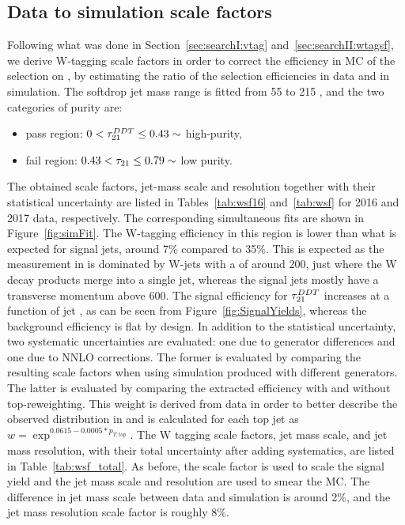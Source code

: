 \subsection{Data to simulation scale factors}
\label{sec:searchIII:wtagSF}
Following what was done in Section~\ref{sec:searchI:vtag} and~\ref{sec:searchII:wtagsf}, we derive W-tagging scale factors in order to correct the efficiency in MC of the selection on \ddt, by estimating the ratio of the selection efficiencies in data and in simulation. The softdrop jet mass range is fitted from 55 to 215 \GeV, and the two categories of purity are:
\begin{itemize}
\itemsep0em
  \item pass region: $0 <  \tau_{21}^{DDT} \leq 0.43 \sim$ high-purity,
  \item fail region: $0.43 < \tau_{21} \leq 0.79 \sim$ low purity.
\end{itemize}
The obtained scale factors, jet-mass scale and resolution together with their statistical uncertainty are listed in Tables~\ref{tab:wsf16} and~\ref{tab:wsf} for 2016 and 2017 data, respectively. The corresponding simultaneous fits are shown in Figure~\ref{fig:simFit}. The W-tagging efficiency in this region is lower than what is expected for signal jets, around 7\% compared to 35\%. This is expected as the measurement in \ttbar is dominated by W-jets with a \PT of around 200\GeV, just where the W decay products merge into a single jet, whereas the signal jets mostly have a transverse momentum above 600\GeV. The signal efficiency for $\tau_{21}^{DDT}$ increases at a function of jet \PT, as can be seen from Figure~\ref{fig:SignalYields}, whereas the background efficiency is flat by design. In addition to the statistical uncertainty, two systematic uncertainties are evaluated: one due to generator differences and one due to NNLO corrections. The former is evaluated by comparing the resulting scale factors when using \ttbar simulation produced with different generators. The latter is evaluated by comparing the extracted efficiency with and without top-\PT reweighting. This weight is derived from data in order to better describe the observed \PT distribution in \ttbar and is calculated for each top jet as $w=\exp^{0.0615-0.0005*p_{T,top}}$. The W tagging scale factors, jet mass scale, and jet mass resolution, with their total uncertainty after adding systematics, are listed in Table~\ref{tab:wsf_total}. As before, the scale factor is used to scale the signal yield and the jet mass scale and resolution are used to smear the MC. The difference in jet mass scale between data and simulation is around 2\%, and the jet mass resolution scale factor is roughly 8\%.
